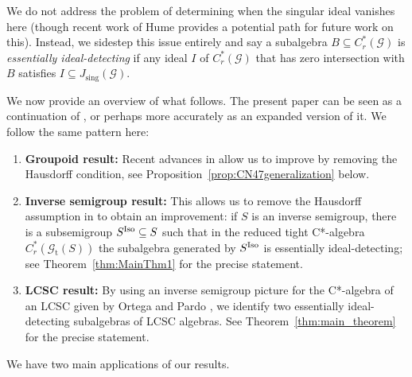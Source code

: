 \documentclass[12pt]{amsart}
\theoremstyle{definition}
\theoremstyle{remark}
\numberwithin{equation}{section}
\newcommand{\gt}{\mathcal{G}_{\text{t}}}
\newcommand{\Iso}{\textup{Iso}}
\newcommand{\g}{\mathcal{G}}
\newcommand{\Js}{J_{\text{sing}}}
\begin{document}
We do not address the problem of determining when the singular ideal vanishes here (though recent work of Hume \cite{H25} provides a potential path for future work on this). Instead, we sidestep this issue entirely and say a subalgebra $B\subseteq C^*_r(\g)$ is {\em essentially ideal-detecting} if any ideal $I$ of $C^*_r(\g)$ that has zero intersection with $B$ satisfies $I\subseteq \Js(\g)$.

We now provide an overview of what follows. The present paper can be seen as a continuation of \cite{St22}, or perhaps more accurately as an expanded version of it. We follow the same pattern here:
\begin{enumerate}
	\item {\bf Groupoid result:} Recent advances in \cite{KKLRU21}  \cite{CN24} allow us to improve \cite[Theorem~2.1]{St22} by removing the Hausdorff condition, see Proposition~\ref{prop:CN47generalization} below.
	\item {\bf Inverse semigroup result:} This allows us to remove the Hausdorff assumption in \cite[Theorem~3.3]{St22} to obtain an improvement: if $S$ is an inverse semigroup, there is a subsemigroup $S^\Iso\subseteq S$ such that in the reduced tight C*-algebra $C^*_r(\gt(S))$ the subalgebra generated by $S^\Iso$ is essentially ideal-detecting; see Theorem~\ref{thm:MainThm1} for the precise statement.
	\item {\bf LCSC result:} By using an inverse semigroup picture for the C*-algebra of an LCSC given by Ortega and Pardo \cite{OP20}, we identify two essentially ideal-detecting subalgebras of LCSC algebras. See Theorem~\ref{thm:main_theorem} for the precise statement.
\end{enumerate}

We have two main applications of our results. 
\end{document}
